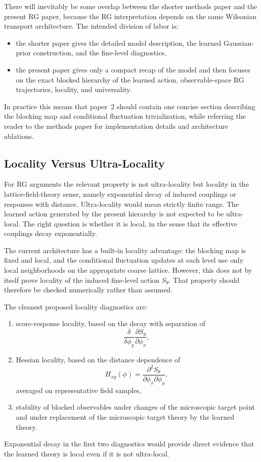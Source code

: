 \documentclass[aps,prd,reprint,nofootinbib,superscriptaddress,longbibliography]{revtex4-2}
\begin{document}
There will inevitably be some overlap between the shorter methods paper and the
present RG paper, because the RG interpretation depends on the same Wilsonian
transport architecture. The intended division of labor is:
\begin{itemize}
\item the shorter paper gives the detailed model description, the learned
Gaussian-prior construction, and the fine-level diagnostics,
\item the present paper gives only a compact recap of the model and then focuses
on the exact blocked hierarchy of the learned action, observable-space RG
trajectories, locality, and universality.
\end{itemize}
In practice this means that paper~2 should contain one concise section
describing the blocking map and conditional fluctuation trivialization, while
referring the reader to the methods paper for implementation details and
architecture ablations.

\subsection{Locality Versus Ultra-Locality}

For RG arguments the relevant property is not ultra-locality but locality in the
lattice-field-theory sense, namely exponential decay of induced couplings or
responses with distance. Ultra-locality would mean strictly finite range. The
learned action generated by the present hierarchy is not expected to be
ultra-local. The right question is whether it is local, in the sense that its
effective couplings decay exponentially.

The current architecture has a built-in locality advantage: the blocking map is
fixed and local, and the conditional fluctuation updates at each level use only
local neighborhoods on the appropriate coarse lattice. However, this does not by
itself prove locality of the induced fine-level action $S_\theta$. That
property should therefore be checked numerically rather than assumed.

The cleanest proposed locality diagnostics are:
\begin{enumerate}
\item score-response locality, based on the decay with separation of
\begin{equation}
\frac{\delta}{\delta \phi_y}\frac{\partial S_\theta}{\partial \phi_x},
\end{equation}
\item Hessian locality, based on the distance dependence of
\begin{equation}
H_{xy}(\phi)=\frac{\partial^2 S_\theta}{\partial \phi_x\partial \phi_y},
\end{equation}
averaged on representative field samples,
\item stability of blocked observables under changes of the microscopic target
point and under replacement of the microscopic target theory by the learned
theory.
\end{enumerate}
Exponential decay in the first two diagnostics would provide direct evidence
that the learned theory is local even if it is not ultra-local.
\end{document}
